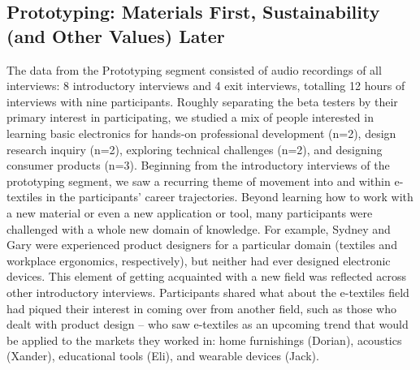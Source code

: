 


\subsection{Prototyping: Materials First, Sustainability (and Other Values) Later}
The data from the Prototyping segment consisted of audio recordings of all interviews: 8 introductory interviews and 4 exit interviews, totalling 12 hours of interviews with nine participants. Roughly separating the beta testers by their primary interest in participating, we studied a mix of people interested in learning basic electronics for hands-on professional development (n=2), design research inquiry (n=2), exploring technical challenges (n=2), and designing consumer products (n=3).
Beginning from the introductory interviews of the prototyping segment, we saw a recurring theme of movement into and within e-textiles in the participants' career trajectories. 
Beyond learning how to work with a new material or even a new application or tool, many participants were challenged with a whole new domain of knowledge. For example, Sydney and Gary were experienced product designers for a particular domain (textiles and workplace ergonomics, respectively), but neither had ever designed electronic devices. This element of getting acquainted with a new field was reflected across other introductory interviews. Participants shared what about the e-textiles field had piqued their interest in coming over from another field, such as those who dealt with product design -- who saw e-textiles as an upcoming trend that would be applied to the markets they worked in: home furnishings (Dorian), acoustics (Xander), educational tools (Eli), and wearable devices (Jack).


